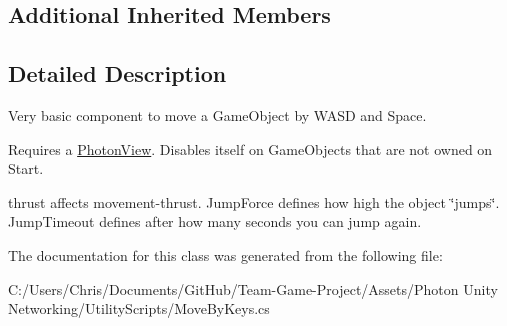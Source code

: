 \subsection*{Additional Inherited Members}


\subsection{Detailed Description}
Very basic component to move a Game\+Object by W\+A\+SD and Space. 

Requires a \hyperlink{class_photon_view}{Photon\+View}. Disables itself on Game\+Objects that are not owned on Start.

thrust affects movement-\/thrust. Jump\+Force defines how high the object \char`\"{}jumps\char`\"{}. Jump\+Timeout defines after how many seconds you can jump again. 

The documentation for this class was generated from the following file\+:\begin{DoxyCompactItemize}
\item 
C\+:/\+Users/\+Chris/\+Documents/\+Git\+Hub/\+Team-\/\+Game-\/\+Project/\+Assets/\+Photon Unity Networking/\+Utility\+Scripts/Move\+By\+Keys.\+cs\end{DoxyCompactItemize}
